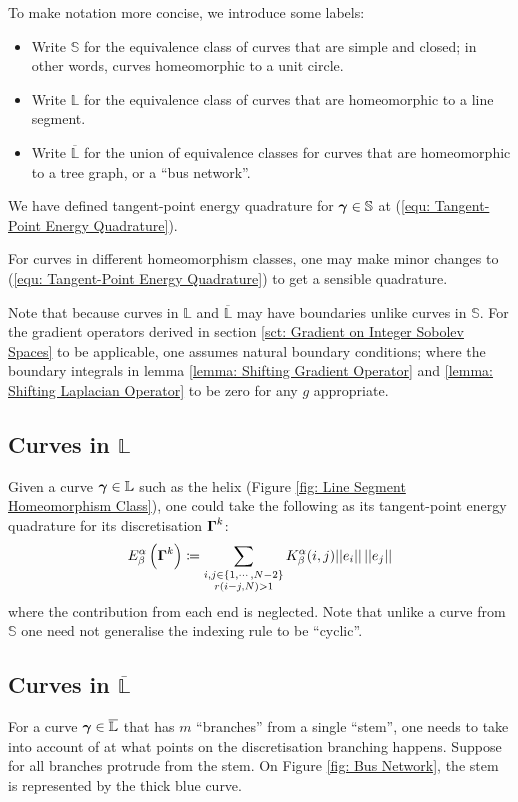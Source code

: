 \documentclass[../dissertation.tex]{subfiles}
\begin{document}
To make notation more concise, we introduce some labels:
\begin{itemize}
    \item Write $\mathbb{S}$ for the equivalence class of curves that are simple and closed; in other words, curves homeomorphic to a unit circle.
    \item Write $\mathbb{L}$ for the equivalence class of curves that are homeomorphic to a line segment.
    \item Write $\overline{\mathbb{L}}$ for the union of equivalence classes for curves that are homeomorphic to a tree graph, or a ``bus network''.
\end{itemize}

We have defined tangent-point energy quadrature for $\boldsymbol{\gamma} \in \mathbb{S}$ at (\ref{equ: Tangent-Point Energy Quadrature}).

For curves in different homeomorphism classes,
one may make minor changes to (\ref{equ: Tangent-Point Energy Quadrature}) to get a sensible quadrature.

Note that because curves in $\mathbb{L}$ and $\overline{\mathbb{L}}$ may have boundaries unlike curves in $\mathbb{S}$.
For the gradient operators derived in section \ref{sct: Gradient on Integer Sobolev Spaces} to be applicable, one assumes natural boundary conditions;
where the boundary integrals in lemma \ref{lemma: Shifting Gradient Operator} and \ref{lemma: Shifting Laplacian Operator} to be zero for any $g$ appropriate.
\subsection{Curves in $\mathbb{L}$}
Given a curve $\boldsymbol{\gamma} \in \mathbb{L}$ such as the helix (Figure \ref{fig: Line Segment Homeomorphism Class}),
one could take the following as its tangent-point energy quadrature for its discretisation $\boldsymbol{\Gamma}^k$:
\begin{equation}
    E_{\beta}^{\alpha} \left( \boldsymbol{\Gamma}^k \right) \coloneqq \sum_{\substack{i,j \in \left\{ 1, \cdots, N-2 \right\} \\ r\left( i-j,N \right) > 1}} K_{\beta}^{\alpha} (i,j) \lvert \lvert e_i \rvert \rvert \, \lvert \lvert e_j \rvert \rvert
\end{equation}
where the contribution from each end is neglected.
Note that unlike a curve from $\mathbb{S}$
one need not generalise the indexing rule to be ``cyclic''.

\subsection{Curves in $\overline{\mathbb{L}}$}
For a curve $\boldsymbol{\gamma} \in \overline{\mathbb{L}}$ that has $m$ ``branches'' from a single ``stem'', one needs to take into account of at what points on the discretisation branching happens.
Suppose for all branches protrude from the stem.
On Figure \ref{fig: Bus Network}, the stem is represented by the thick blue curve.
\end{document}
